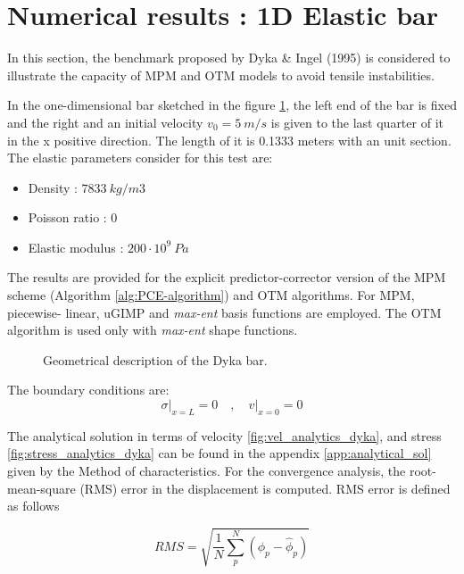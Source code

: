 \section{Numerical results : 1D Elastic bar}
\label{sec:dynamic-benchmark}

In this section, the benchmark proposed by Dyka \& Ingel
(1995)\cite{Dyka1995} is considered to illustrate the
capacity of MPM \cite{Sulsky1994} and OTM
models to avoid tensile instabilities. 

In the one-dimensional bar sketched in
the figure \ref{fig:Dyka_Bar}, the left end of the bar is fixed and
the right and an initial velocity $v_0 = 5\ m/s$ is given to the last
quarter of it in the x positive direction. The length of it is 0.1333
meters with an unit section. The elastic parameters consider for this
test are:
\begin{itemize} 
\item  Density : $7833\ kg/m3$
\item  Poisson ratio : $0$
\item  Elastic modulus : $200 \cdot 10^9\ Pa$
\end{itemize}

The results are provided for the explicit predictor-corrector version of the
MPM scheme (Algorithm \ref{alg:PCE-algorithm}) and OTM algorithms. For MPM, piecewise-
linear, uGIMP and \textit{max-ent} basis functions are employed. The OTM
algorithm is used only with \textit{max-ent} shape functions. 

\begin{figure}\sidecaption
  \centering
  \resizebox{0.8\hsize}{!}{
    }
  \caption{Geometrical description of the Dyka \cite{Dyka1995} bar. }
  \label{fig:Dyka_Bar}
\end{figure}

The boundary conditions are:
\begin{equation}
  \label{eq:3}
  \sigma \rvert_{x=L} = 0 \quad , \quad v \rvert_{x=0} = 0
\end{equation}

The analytical solution in terms of velocity
\ref{fig:vel_analytics_dyka}, and stress
\ref{fig:stress_analytics_dyka} can be found in the appendix
\ref{app:analytical_sol} given by the Method of characteristics. For
the convergence analysis, the root-mean-square (RMS) error in the
displacement is computed. RMS error is defined as follows

\begin{equation}
  \label{eq:RMS}
  RMS = \sqrt{\frac{1}{N} \sum^{N}_p \left( \phi_p - \hat{\phi}_p \right)}
\end{equation}

